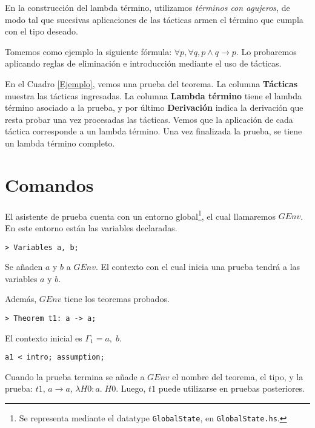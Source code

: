 \documentclass[a4paper,11pt]{article}
\theoremstyle{definition}
\theoremstyle{remark}
\begin{document}
\begin{table}[]
\begin{tabular}{|c|c|c|}
\end{tabular}
\end{table}

En la construcción del lambda término, utilizamos \textit{términos con agujeros}, de modo tal que sucesivas aplicaciones 
de las tácticas armen el término que cumpla con el tipo deseado.

Tomemos como ejemplo la siguiente fórmula: $\forall p, \forall q, p \wedge q \rightarrow p$.
Lo probaremos aplicando reglas de eliminación e introducción mediante el uso de tácticas.

En el Cuadro \ref{Ejemplo}, vemos una prueba del teorema.
La columna \textbf{Tácticas} muestra las tácticas ingresadas. 
La columna \textbf{Lambda término} tiene el lambda término asociado a la prueba, 
y por último \textbf{Derivación} indica la derivación que resta probar una vez procesadas las tácticas.
Vemos que la aplicación de cada táctica corresponde a un lambda término.
Una vez finalizada la prueba, se tiene un lambda término completo.

\section{Comandos}

El asistente de prueba cuenta con un entorno global\footnote{Se representa mediante el datatype \texttt{GlobalState}, 
en \texttt{GlobalState.hs}.}, el cual llamaremos $GEnv$.
En este entorno están las variables declaradas.

\begin{verbatim}
> Variables a, b;
\end{verbatim}

Se añaden $a$ y $b$ a $GEnv$. El contexto con el cual inicia una prueba tendrá a las variables $a$ y $b$.

Además, $GEnv$ tiene los teoremas probados.

\begin{verbatim}
> Theorem t1: a -> a;
\end{verbatim}
  
El contexto inicial es $\Gamma_1 = a, \; b$. 

\begin{verbatim}
a1 < intro; assumption;
\end{verbatim}

Cuando la prueba termina se añade a $GEnv$ el nombre del teorema, el tipo, y
la prueba: $t1$, $a \rightarrow a$, $\lambda H0:a. \; H0$.
Luego,  $t1$ puede utilizarse en pruebas posteriores.
\end{document}
